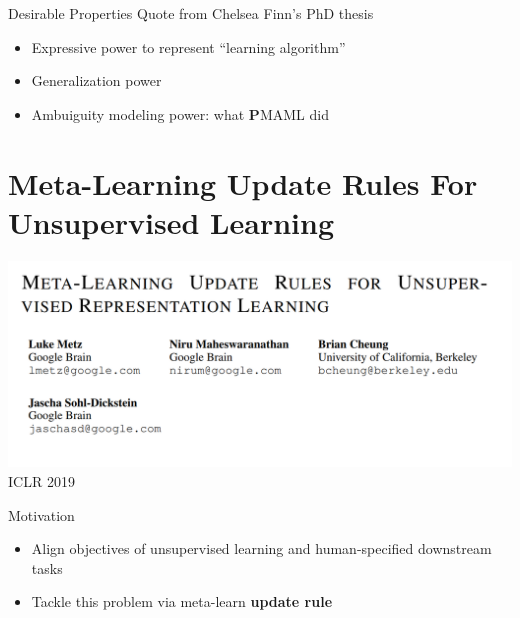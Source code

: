 \documentclass{beamer}
\begin{document}
\begin{frame}{Desirable Properties}
  Quote from Chelsea Finn's PhD thesis
  \begin{itemize}
    \item Expressive power to represent ``learning algorithm''
    \item Generalization power
    \item Ambuiguity modeling power: what \textbf{P}MAML did
  \end{itemize}
\end{frame}


\section{Meta-Learning Update Rules For Unsupervised Learning}
\begin{frame}
  \includegraphics[width=\textwidth]{fig/title.png}
  \center ICLR 2019
\end{frame}

\begin{frame}{Motivation}
  \begin{itemize}
    \item Align objectives of unsupervised learning and human-specified downstream tasks
    \item Tackle this problem via meta-learn \textbf{update rule}
  \end{itemize}
\end{frame}
\end{document}
